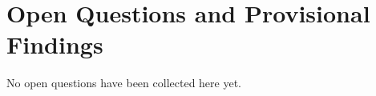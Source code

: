 \section{Open Questions and Provisional Findings}
\label{sec:open-questions}

No open questions have been collected here yet.
